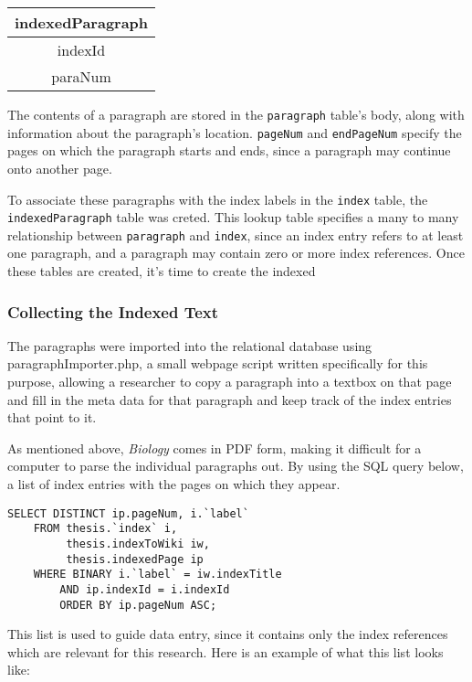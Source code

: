 \begin{center}
\begin{tabular}{|c|}
\hline 
\textbf{indexedParagraph} \\ 
\hline 
indexId \\ 
\hline 
paraNum \\ 
\hline 
\end{tabular} 
\end{center}

The contents of a paragraph are stored in the {\tt paragraph} table's body, along with information about the paragraph's location.
{\tt pageNum} and {\tt endPageNum} specify the pages on which the paragraph starts and ends, since a paragraph may continue onto another page.

To associate these paragraphs with the index labels in the {\tt index} table, the {\tt indexedParagraph} table was creted.
This lookup table specifies a many to many relationship between {\tt paragraph} and {\tt index}, since an index entry refers to at least one paragraph, and a paragraph may contain zero or more index references. Once these tables are created, it's time to create the indexed

\subsubsection{Collecting the Indexed Text}

The paragraphs were imported into the relational database using paragraphImporter.php, a small webpage script written specifically for this purpose, allowing a researcher to copy a paragraph into a textbox on that page and fill in the meta data for that paragraph and keep track of the index entries that point to it.

As mentioned above, {\it Biology} comes in PDF form, making it difficult for a computer to parse the individual paragraphs out.
By using the SQL query below, a list of index entries with the pages on which they appear.

\begin{lstlisting}
SELECT DISTINCT ip.pageNum, i.`label`
    FROM thesis.`index` i,
         thesis.indexToWiki iw,
         thesis.indexedPage ip
    WHERE BINARY i.`label` = iw.indexTitle
        AND ip.indexId = i.indexId
        ORDER BY ip.pageNum ASC;
\end{lstlisting}

This list is used to guide data entry, since it contains only the index references which are relevant for this research.
Here is an example of what this list looks like:

